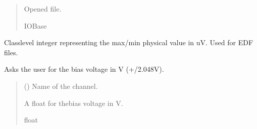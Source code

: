 \documentclass[letterpaper,10pt,english]{sphinxmanual}
\begin{document}
\begin{fulllineitems}
\begin{fulllineitems}
\begin{quote}
\begin{description}
\sphinxAtStartPar
Opened file.

\sphinxAtStartPar
IOBase

\end{description}\end{quote}

\end{fulllineitems}


\begin{fulllineitems}
\label{\detokenize{Setup_8401HR:Setup_8401HR.Setup_8401HR._PHYSICAL_BOUND_uV}}
\pysigstartsignatures
{}
\pysigstopsignatures
\sphinxAtStartPar
Class\sphinxhyphen{}level integer representing the max/\sphinxhyphen{}min physical value in uV. Used for     EDF files.

\end{fulllineitems}


\begin{fulllineitems}
\label{\detokenize{Setup_8401HR:Setup_8401HR.Setup_8401HR._SetBias}}
\pysigstartsignatures
{}
\pysigstopsignatures
\sphinxAtStartPar
Asks the user for the bias voltage in V (+/\sphinxhyphen{}2.048V).
\begin{quote}\begin{description}
\sphinxAtStartPar
{} () \textendash{} Name of the channel.

\sphinxAtStartPar
A float for thebias voltage in V.

\sphinxAtStartPar
float

\end{description}\end{quote}


\end{fulllineitems}
\end{fulllineitems}
\end{document}

